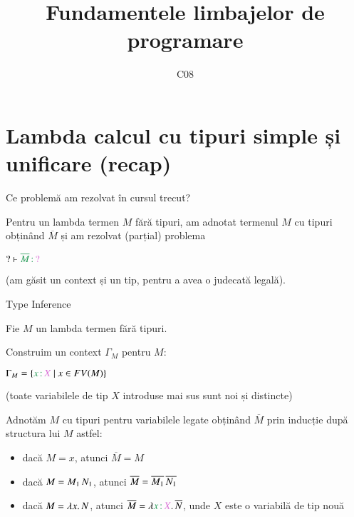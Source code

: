 \documentclass[xcolor=pdftex,romanian,colorlinks]{beamer}
\title[FLP]{Fundamentele limbajelor de programare}
\subtitle{C08}
\date{}
\begin{document}
\begin{frame}
  \titlepage
\end{frame}

\setlength{\leftmargini}{12pt}


\section{\color{section-color} Lambda calcul cu tipuri simple și unificare (recap)}


\begin{frame}{Ce problemă am rezolvat în cursul trecut?}


Pentru un lambda termen $M$ fără tipuri, am adnotat termenul $M$ cu tipuri obținând $\overline{M}$ și am rezolvat (parțial) problema
\vspace{-.3cm}
\begin{center}
$? \vdash \type{\overline{M}}{?}$
\end{center}
(am găsit un context și un tip, pentru a avea o judecată legală).

\end{frame}

\begin{frame}{Type Inference}

Fie $M$ un lambda termen fără tipuri.

Construim un context \alert{$\Gamma_M$} pentru $M$:
\vspace{-.2cm}
\begin{center}
$\Gamma_M = \{\type{x}{X}\ |\ x \in FV(M)\}$
\end{center}
\vspace{-.2cm}
(toate variabilele de tip $X$ introduse mai sus sunt noi și distincte)


  \vspace{.2cm}
Adnotăm $M$ cu tipuri pentru variabilele legate obținând \alert{$\overline{M}$} prin inducție după structura lui $M$ astfel:
\vspace{-.2cm}
\begin{itemize}
	\item dacă $M = x$, atunci $\overline{M} = M$
	\item dacă $M = M_1\, N_1$, atunci $\overline{M} = \overline{M_1}\, \overline{N_1}$
	\item dacă $M = \lambda x.\,N$, atunci $\overline{M} = \abs{\type{x}{X}}{\overline{N}}$, unde $X$ este o variabilă de tip nouă
\end{itemize}
\end{frame}
\end{document}
